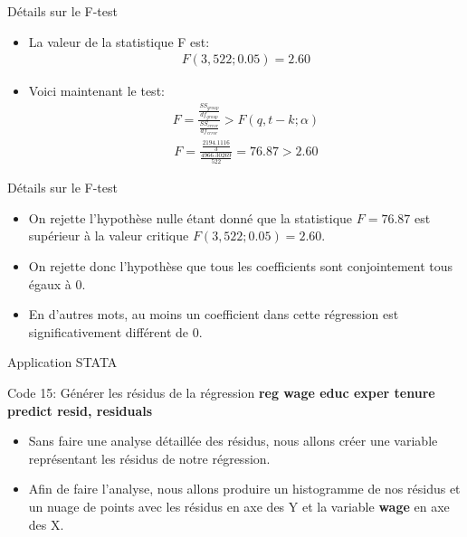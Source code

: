 \documentclass{beamer}
\begin{document}
\begin{frame}{Détails sur le F-test}
\begin{itemize}
\item La valeur de la statistique F est:
\begin{align*}
F(3,522;0.05)=2.60
\end{align*}
\item Voici maintenant le test:
\begin{align*}
F=\frac{\frac{SS_{group}}{df_{group}}}{\frac{SS_{error}}{df_{error}}}>F(q,t-k;\alpha)
\end{align*}
\begin{align*}
F=\frac{\frac{2194.1116}{3}}{\frac{4966.30269}{522}}=76.87>2.60
\end{align*}
\end{itemize}
\end{frame}


\begin{frame}{Détails sur le F-test}
\begin{itemize}
\item On rejette l'hypothèse nulle étant donné que la statistique $F=76.87$ est supérieur à la valeur critique $F(3,522;0.05)=2.60$.
\item On rejette donc l'hypothèse que tous les coefficients sont conjointement tous égaux à 0.
\item En d'autres mots, au moins un coefficient dans cette régression est significativement différent de 0.
\end{itemize}
\end{frame}


\begin{frame}{Application STATA}

\begin{block}{Code 15: Générer les résidus de la régression}
\textbf{reg wage educ exper tenure}\\
\textbf{predict resid, residuals}
\end{block}
\begin{itemize}
\item Sans faire une analyse détaillée des résidus, nous allons créer une variable représentant les résidus de notre régression.
\item Afin de faire l'analyse, nous allons produire un histogramme de nos résidus et un nuage de points avec les résidus en axe des Y et la variable \textbf{wage} en axe des X.
\end{itemize}
\end{frame}
\end{document}
